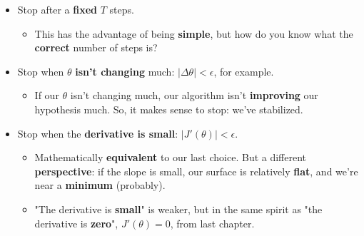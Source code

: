     \begin{itemize}
        \item Stop after a \textbf{fixed} $T$ steps.
            \begin{itemize}
                \item This has the advantage of being \textbf{simple}, but how do you know what the \textbf{correct} number of steps is?
            \end{itemize}
        
        \item Stop when $\theta$ \textbf{isn't changing} much: $\big| \Delta \theta \big| < \epsilon$, for example.
        \begin{itemize}
            \item If our $\theta$ isn't changing much, our algorithm isn't \textbf{improving} our hypothesis much. So, it makes sense to stop: we've stabilized.
        \end{itemize}
        
        \item Stop when the \textbf{derivative is small}: $\big| J'(\theta) \big| < \epsilon$.
        \begin{itemize}
            \item Mathematically \textbf{equivalent} to our last choice. But a different \textbf{perspective}: if the slope is small, our surface is relatively \textbf{flat}, and we're near a \textbf{minimum} (probably).
            
            \item "The derivative is \textbf{small}" is weaker, but in the same spirit as "the derivative is \textbf{zero}", $J'(\theta)=0$, from last chapter.
        \end{itemize}
        
    \end{itemize}